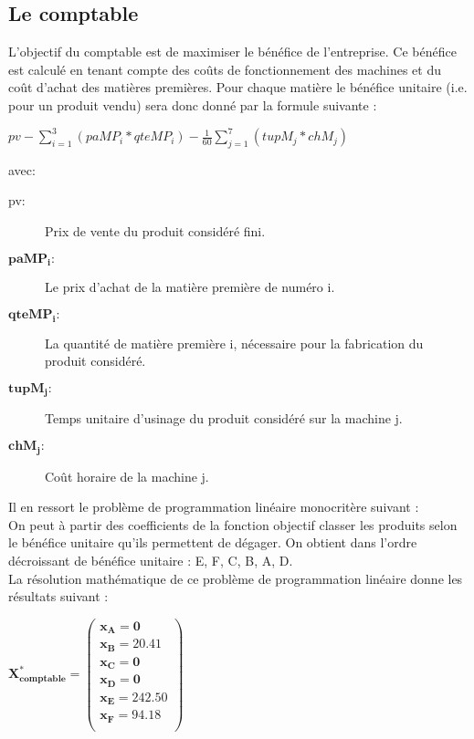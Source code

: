 \documentclass[12pt]{article}
\begin{document}
\subsection{Le comptable}
L'objectif du comptable est de maximiser le bénéfice de l'entreprise. Ce bénéfice est calculé en tenant compte des coûts de fonctionnement des machines et du coût d'achat des matières premières. Pour chaque matière le bénéfice unitaire (i.e. pour un produit vendu) sera donc donné par la formule suivante : \begin{center} $pv - \sum_{i=1}^{3}(paMP_{i} * qteMP_{i}) - \frac{1}{60} \sum_{j=1}^{7}(tupM_{j} * chM_{j}) $ \end{center} avec: \newline 
\begin{description}
\item[pv: ]Prix de vente du produit considéré fini.
\item[$\mathbf{paMP_{i} :}$] Le prix d'achat de la matière première de numéro i.
\item[$\mathbf{qteMP_{i} :}$] La quantité de matière première i, nécessaire pour la fabrication du produit considéré.
\item[$\mathbf{tupM_{j} :}$] Temps unitaire d'usinage du produit considéré sur la machine j.
\item[$\mathbf{chM_{j} :}$] Coût horaire de la machine j.
\end{description}
Il en ressort le problème de programmation linéaire monocritère suivant : \newline 
\noindent{}
\\
On peut à partir des coefficients de la fonction objectif classer les produits selon le bénéfice unitaire qu'ils permettent de dégager. On obtient dans l'ordre décroissant de bénéfice unitaire : E, F, C, B, A, D.
\\
La résolution mathématique de ce problème de programmation linéaire donne les résultats suivant :\\
\begin{center}
$\mathbf{X^{*}_{comptable} = 
   \left (
   \begin{array}{c}
      x_{A} = 0 \\
      x_{B} = 20.41 \\
      x_{C} = 0 \\
      x_{D} = 0 \\
      x_{E} = 242.50 \\
      x_{F} = 94.18 \\
   \end{array}
   \right )
 } $ 
\end{center}
\end{document}
